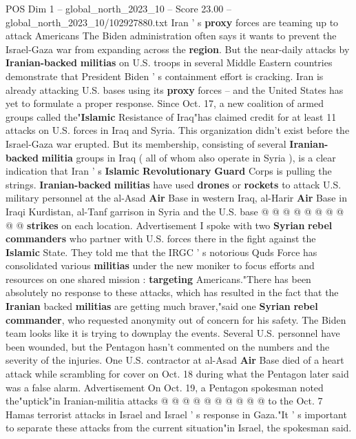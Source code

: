 \begin{textsample}{POS Dim 1 – global\_north\_2023\_10 – Score 23.00 – global\_north\_2023\_10/102927880.txt}  \label{ex:f1_pos_141}
Iran ' s \textbf{proxy} forces are teaming up to attack Americans The Biden administration often says it wants to prevent the Israel-Gaza war from expanding across the \textbf{region}.
But the near-daily attacks by \textbf{Iranian-backed} \textbf{militias} on U.S. troops in several Middle Eastern countries demonstrate that President Biden ' s containment effort is cracking.
Iran is already attacking U.S. bases using its \textbf{proxy} forces -- and the United States has yet to formulate a proper response.
Since Oct. 17, a new coalition of armed groups called the"\textbf{Islamic} Resistance of Iraq"has claimed credit for at least 11 attacks on U.S. forces in Iraq and Syria.
This organization didn't exist before the Israel-Gaza war erupted.
But its membership, consisting of several \textbf{Iranian-backed} \textbf{militia} groups in Iraq ( all of whom also operate in Syria ), is a clear indication that Iran ' s \textbf{Islamic} \textbf{Revolutionary} \textbf{Guard} Corps is pulling the strings. \textbf{Iranian-backed} \textbf{militias} have used \textbf{drones} or \textbf{rockets} to attack U.S. military personnel at the al-Asad \textbf{Air} Base in western Iraq, al-Harir \textbf{Air} Base in Iraqi Kurdistan, al-Tanf garrison in Syria and the U.S. base @ @ @ @ @ @ @ @ @ @ \textbf{strikes} on each location.
Advertisement I spoke with two \textbf{Syrian} \textbf{rebel} \textbf{commanders} who partner with U.S. forces there in the fight against the \textbf{Islamic} State.
They told me that the IRGC ' s notorious Quds Force has consolidated various \textbf{militias} under the new moniker to focus efforts and resources on one shared mission : \textbf{targeting} Americans."There has been absolutely no response to these attacks, which has resulted in the fact that the \textbf{Iranian} backed \textbf{militias} are getting much braver,"said one \textbf{Syrian} \textbf{rebel} \textbf{commander}, who requested anonymity out of concern for his safety.
The Biden team looks like it is trying to downplay the events.
Several U.S. personnel have been wounded, but the Pentagon hasn't commented on the numbers and the severity of the injuries.
One U.S. contractor at al-Asad \textbf{Air} Base died of a heart attack while scrambling for cover on Oct. 18 during what the Pentagon later said was a false alarm.
Advertisement On Oct. 19, a Pentagon spokesman noted the"uptick"in Iranian-militia attacks @ @ @ @ @ @ @ @ @ @ to the Oct. 7 Hamas terrorist attacks in Israel and Israel ' s response in Gaza."It ' s important to separate these attacks from the current situation"in Israel, the spokesman said.

\end{textsample}
